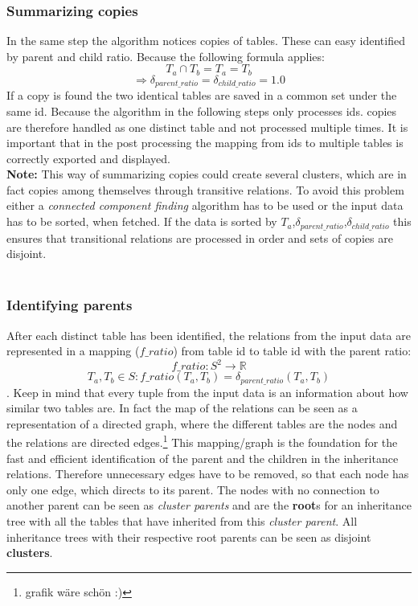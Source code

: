 \documentclass[10pt, journal, twocolumn]{IEEEtran}
\begin{document}
\subsubsection{Summarizing copies}
In the same step the algorithm notices copies of tables. These can easy identified by parent and child ratio. Because the following formula applies: $$ T_a \cap T_b = T_a = T_b$$ $$\Rightarrow \delta_{parent\_ratio} =  \delta_{child\_ratio} = 1.0$$
If a copy is found the two identical tables are saved in a common set under the same id. Because the algorithm in the following steps only processes ids. copies are therefore handled as one distinct table and not processed multiple times. It is important that in the post processing the mapping from ids to multiple tables is correctly exported and displayed.\\
\textbf{Note:} This way of summarizing copies could create several clusters, which are in fact copies among themselves through transitive relations. To avoid this problem either a \textit{connected component finding} algorithm has to be used or the input data has to be sorted, when fetched. If the data is sorted by $T_a$,$\delta_{parent\_ratio}$,$\delta_{child\_ratio}$ this ensures that transitional relations are processed in order and sets of copies are disjoint.\\
\\\subsubsection{Identifying parents}
After each distinct table has been identified, the relations from the input data are represented in a mapping ($f\_ratio$) from table id to table id with the parent ratio: $$f\_ratio: S^{2} \rightarrow \mathbb{R}$$ $$T_a, T_b \in S: f\_ratio(T_a, T_b) = \delta_{parent\_ratio}(T_a,T_b)$$ .  Keep in mind that every tuple from the input data is an information about how similar two tables are. In fact the map of the relations can be seen as a representation of a directed graph, where the different tables are the nodes and the relations are directed edges.\footnote{grafik wäre schön :) } This mapping/graph is the foundation for the fast and efficient identification of the parent and the children in the inheritance relations. Therefore unnecessary edges have to be removed, so that each node has only one edge, which directs to its parent. The nodes with no connection to another parent can be seen as \textit{cluster parents} and are the \textbf{root}s for an inheritance tree with all the tables that have inherited from this \textit{cluster parent}. All inheritance trees with their respective root parents can be seen as disjoint \textbf{clusters}.
\end{document}

